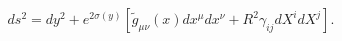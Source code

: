 \begin{equation}
    \label{pertbulkmetr}
    ds^2=dy^2+e^{2\sigma(y)}\left[\tilde g_{\mu\nu}(x)dx^\mu
dx^\nu + R^2 \gamma_{ij} dX^i
    dX^j\right].
\end{equation}

